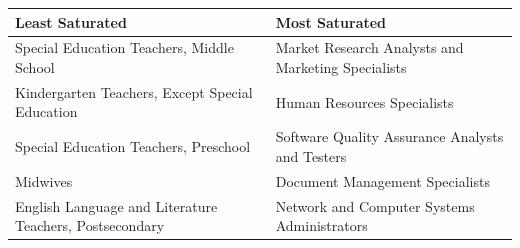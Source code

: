 \begin{tabularx}{\textwidth}{@{} L L @{}}
\toprule
\textmd{Least Saturated} & 
\textmd{Most Saturated} \\
\midrule
Special Education Teachers, Middle School & 
Market Research Analysts and Marketing Specialists \\[0.6em]

Kindergarten Teachers, Except Special Education & 
Human Resources Specialists \\[0.6em]

Special Education Teachers, Preschool & 
Software Quality Assurance Analysts and Testers \\[0.6em]

Midwives & 
Document Management Specialists \\[0.6em]

English Language and Literature Teachers, Postsecondary & 
Network and Computer Systems Administrators \\
\bottomrule
\end{tabularx}